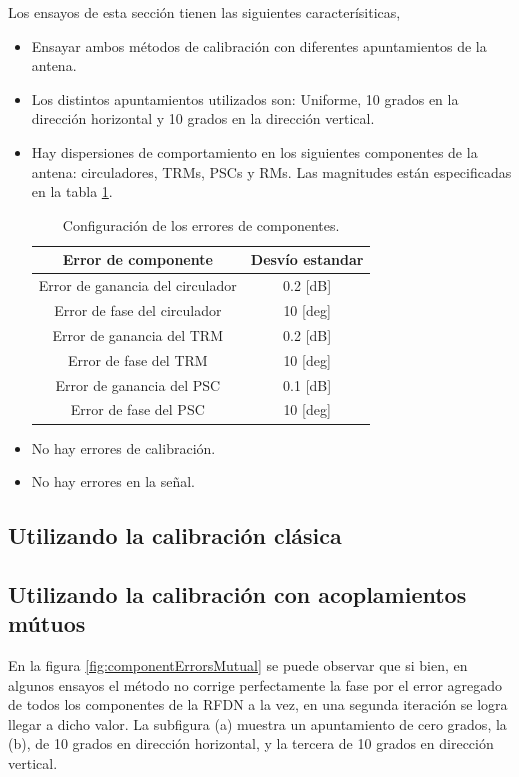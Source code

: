 Los ensayos de esta sección tienen las siguientes caracterísiticas,
\begin{itemize}
	\item Ensayar ambos métodos de calibración con diferentes apuntamientos de la antena.
	\item Los distintos apuntamientos utilizados son: Uniforme, 10 grados en la dirección horizontal y 10 grados en la dirección 
		vertical.
	\item Hay dispersiones de comportamiento en los siguientes componentes de la antena: circuladores, TRMs, PSCs y RMs. Las 
		magnitudes están especificadas en la tabla \ref{tab:errorReferences}.
		\begin{table}[H]
		  \footnotesize
		  \centering
		  \begin{tabular}{|c|c|}
			\hline
			\textbf{Error de componente} & \textbf{Desvío estandar} \tabularnewline \hline 
			Error de ganancia del circulador &  0.2 [dB] \tabularnewline\hline 
			Error de fase del circulador &  10 [deg] \tabularnewline\hline 
			Error de ganancia del TRM &  0.2 [dB] \tabularnewline\hline 
			Error de fase del TRM &  10 [deg] \tabularnewline\hline 
			Error de ganancia del PSC &  0.1 [dB] \tabularnewline\hline 
			Error de fase del PSC &  10 [deg] \tabularnewline\hline 
		  \end{tabular}
		  \caption{Configuración de los errores de componentes.}
		  \label{tab:errorReferences}
		\end{table}
	\item No hay errores de calibración.
	\item No hay errores en la señal.
\end{itemize}

\subsection{Utilizando la calibración clásica}
\subsection{Utilizando la calibración con acoplamientos mútuos}

En la figura \ref{fig:componentErrorsMutual} se puede observar que si bien, en algunos ensayos el método no corrige 
perfectamente la fase por el error agregado de todos los componentes de la RFDN a la vez, en una segunda iteración se logra 
llegar a dicho valor. La subfigura (a) muestra un apuntamiento de cero grados, la (b), de 10 grados en 
dirección horizontal, y la tercera de 10 grados en dirección vertical.

